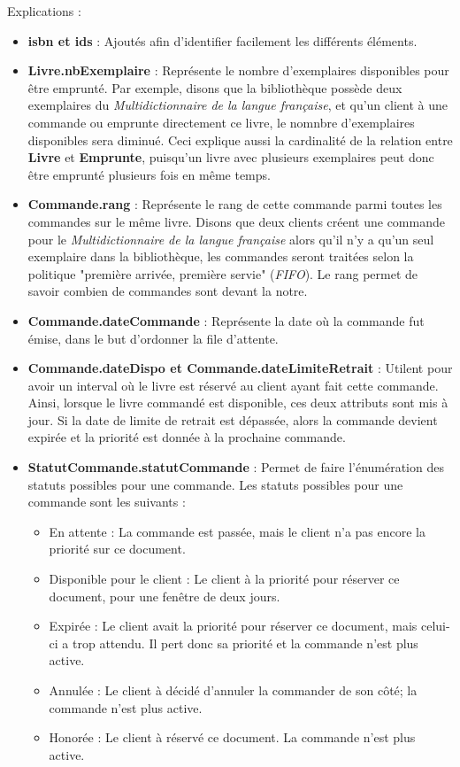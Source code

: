 \documentclass{article}
\begin{document}
Explications :
\begin{itemize}
\item \textbf{isbn et ids} : Ajoutés afin d'identifier facilement les
  différents éléments.
\item \textbf{Livre.nbExemplaire} : Représente le nombre d'exemplaires
  disponibles pour être emprunté. Par exemple, disons que la bibliothèque
  possède deux exemplaires du \textit{Multidictionnaire de la langue
    française}, et qu'un client à une commande ou emprunte directement ce
  livre, le nomnbre d'exemplaires disponibles sera diminué. Ceci explique aussi
  la cardinalité de la relation entre \textbf{Livre} et \textbf{Emprunte},
  puisqu'un livre avec plusieurs exemplaires peut donc être emprunté plusieurs
  fois en même temps.
\item \textbf{Commande.rang} : Représente le rang de cette commande parmi
  toutes les commandes sur le même livre. Disons que deux clients créent une
  commande pour le  \textit{Multidictionnaire de la langue française} alors
  qu'il n'y a qu'un seul exemplaire dans la bibliothèque, les commandes seront
  traitées selon la politique "première arrivée, première servie"
  (\textit{FIFO}). Le rang permet de savoir combien de commandes sont devant la
  notre.
\item \textbf{Commande.dateCommande} : Représente la date où la commande fut
  émise, dans le but d'ordonner la file d'attente.
\item \textbf{Commande.dateDispo et Commande.dateLimiteRetrait} : Utilent pour
  avoir un interval où le livre est réservé au client ayant fait cette
  commande. Ainsi, lorsque le livre commandé est disponible, ces deux attributs
  sont mis à jour. Si la date de limite de retrait est dépassée, alors la
  commande devient expirée et la priorité est donnée à la prochaine commande.
\item \textbf{StatutCommande.statutCommande} : Permet de faire l'énumération
  des statuts possibles pour une commande. Les statuts possibles pour une
  commande sont les suivants :
  \begin {itemize} [label=$\bullet$]
  \item En attente : La commande est passée, mais le client n'a pas encore la
    priorité sur ce document.
  \item Disponible pour le client : Le client à la priorité pour réserver ce
    document, pour une fenêtre de deux jours.
  \item Expirée : Le client avait la priorité pour réserver ce document, mais
    celui-ci a trop attendu. Il pert donc sa priorité et la commande n'est plus
    active.
  \item Annulée : Le client à décidé d'annuler la commander de son côté; la
    commande n'est plus active.
  \item Honorée : Le client à réservé ce document. La commande n'est plus
    active.
  \end{itemize}
  

\end{itemize}
\end{document}
